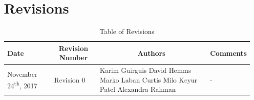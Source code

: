 \documentclass [10pt]{article}
\begin{document}

\pagebreak


\tableofcontents
\listoftables

\pagebreak


\section{Revisions}
\begin{longtable}{| p{ } | p{ } | p{ } | p{ } |}\caption{Table of Revisions}  \\

\hline 
\centering \textbf{Date} & 
\multicolumn{1}{c}{\textbf {Revision Number}} &
\multicolumn{1}{|c}{\textbf {Authors}} & 
\multicolumn{1}{|c|}{\textbf {Comments}} \\ \hline

\multirow{4}{*}{\centering November 24\textsuperscript{th}, 2017}  & 
\multirow{4}{*}{Revision 0}& 
		{Karim Guirguis \newline
		David Hemms \newline
		Marko Laban \newline
		Curtis Milo \newline
		Keyur Patel \newline
		Alexandra Rahman}
 &
 
\multirow{4}{*}{-} \\ 
\hline 

\end{longtable}



\pagebreak

\end{document}
